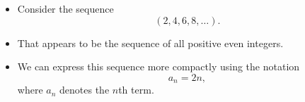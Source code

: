 \begin{frame}
\begin{example}
\begin{itemize}
\item Consider the sequence
\[
\left(2, 4, 6, 8, \ldots \right).
\]
\item<2-> That appears to be the sequence of all positive even integers.
\item<3-> We can express this sequence more compactly using the notation
\vskip -0.1cm
\[
a_n = 2n,
\]
where $a_n$ denotes the $n$th term.  
\end{itemize}
\end{example}

\end{frame}
